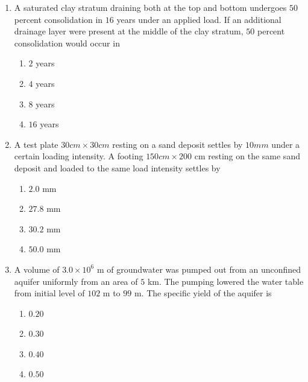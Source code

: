 \documentclass[journal]{IEEEtran}
\begin{document}
\begin{enumerate}
\item A saturated clay stratum draining both at the top and bottom undergoes $50$ percent consolidation in $16$ years under an applied load. If an additional drainage layer were present at the middle of the clay stratum, $50$ percent consolidation would occur in \textbf{}

\begin{multicols}{2}

\begin{enumerate}
\item $2$  years
\item $4$  years
\item $8$  years
\item $16$ years
\end{enumerate}     
\end{multicols}

\item A test plate $30 cm \times 30 cm$ resting on a sand deposit settles by $10 mm$ under a certain loading intensity. A footing $150 cm \times 200$ cm resting on the same sand deposit and loaded to the same load intensity settles by \textbf{}

\begin{multicols}{2}

\begin{enumerate}
\item $2.0$ mm
\item $27.8$ mm
\item $30.2$ mm
\item $50.0$ mm
\end{enumerate}     
\end{multicols}

\item A volume of $3.0 \times 10^{6}$ m of groundwater was pumped out from an unconfined aquifer uniformly from an area of $5$ km. The pumping lowered the water table from initial level of $102$ m to $99$ m. The specific yield of the aquifer is \textbf{}

\begin{multicols}{2}

\begin{enumerate}
\item $0.20$ 
\item $0.30$ 
\item $0.40$ 
\item $0.50$ 
\end{enumerate}     
\end{multicols}


\end{enumerate}
\end{document}
